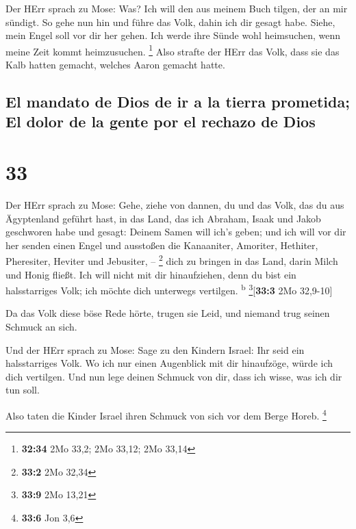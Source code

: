  Der HErr sprach zu Mose: Was? Ich will den aus meinem
Buch tilgen, der an mir sündigt.  So gehe nun hin und
führe das Volk, dahin ich dir gesagt habe. Siehe, mein Engel soll vor
dir her gehen. Ich werde ihre Sünde wohl heimsuchen, wenn meine Zeit
kommt heimzusuchen. \footnote{\textbf{32:34} 2Mo 33,2; 2Mo 33,12; 2Mo
  33,14}  Also strafte der HErr das Volk, dass sie das
Kalb hatten gemacht, welches Aaron gemacht hatte.

\hypertarget{el-mandato-de-dios-de-ir-a-la-tierra-prometida-el-dolor-de-la-gente-por-el-rechazo-de-dios}{%
\subsection{El mandato de Dios de ir a la tierra prometida; El dolor de
la gente por el rechazo de
Dios}\label{el-mandato-de-dios-de-ir-a-la-tierra-prometida-el-dolor-de-la-gente-por-el-rechazo-de-dios}}

\hypertarget{section-32}{%
\section{33}\label{section-32}}

 Der HErr sprach zu Mose: Gehe, ziehe von dannen, du und
das Volk, das du aus Ägyptenland geführt hast, in das Land, das ich
Abraham, Isaak und Jakob geschworen habe und gesagt: Deinem Samen will
ich's geben;  und ich will vor dir her senden einen Engel
und ausstoßen die Kanaaniter, Amoriter, Hethiter, Pheresiter, Heviter
und Jebusiter, -- \footnote{\textbf{33:2} 2Mo 32,34}  dich
zu bringen in das Land, darin Milch und Honig fließt. Ich will nicht mit
dir hinaufziehen, denn du bist ein halsstarriges Volk; ich möchte dich
unterwegs vertilgen. \textsuperscript{b} \footnote{\textbf{33:9} 2Mo
  13,21}{[}\textbf{33:3} 2Mo 32,9-10{]}

 Da das Volk diese böse Rede hörte, trugen sie Leid, und
niemand trug seinen Schmuck an sich.

 Und der HErr sprach zu Mose: Sage zu den Kindern Israel:
Ihr seid ein halsstarriges Volk. Wo ich nur einen Augenblick mit dir
hinaufzöge, würde ich dich vertilgen. Und nun lege deinen Schmuck von
dir, dass ich wisse, was ich dir tun soll.

 Also taten die Kinder Israel ihren Schmuck von sich vor
dem Berge Horeb. \footnote{\textbf{33:6} Jon 3,6}

